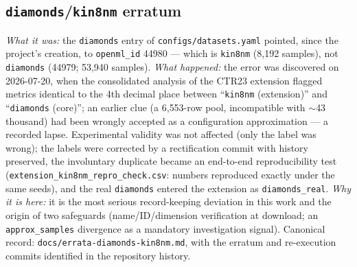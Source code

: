 \subsection{\texttt{diamonds}/\texttt{kin8nm} erratum}
\emph{What it was:} the \texttt{diamonds} entry of
\texttt{configs/\allowbreak datasets.\allowbreak yaml} pointed, since
the project's creation, to \texttt{openml\_id} 44980 --- which is
\texttt{kin8nm} (8{,}192 samples), not \texttt{diamonds} (44979;
53{,}940 samples). \emph{What happened:} the error was discovered on
2026-07-20, when the consolidated analysis of the CTR23 extension
flagged metrics identical to the 4th decimal place between
``\texttt{kin8nm} (extension)'' and ``\texttt{diamonds} (core)''; an
earlier clue (a 6{,}553-row pool, incompatible with $\sim$43
thousand) had been wrongly accepted as a configuration approximation
--- a recorded lapse. Experimental validity was not affected (only
the label was wrong); the labels were corrected by a rectification
commit with history preserved, the involuntary duplicate became an
end-to-end reproducibility test
(\texttt{extension\_\allowbreak kin8nm\_\allowbreak repro\_\allowbreak check.\allowbreak csv}:
numbers reproduced exactly under the same seeds), and the real
\texttt{diamonds} entered the extension as \texttt{diamonds\_real}.
\emph{Why it is here:} it is the most serious record-keeping
deviation in this work and the origin of two safeguards (name/ID/dimension
verification at download; an \texttt{approx\_\allowbreak samples}
divergence as a mandatory investigation signal). Canonical record:
\texttt{docs/\allowbreak errata-\allowbreak diamonds-\allowbreak kin8nm.\allowbreak md},
with the erratum and re-execution commits identified in the
repository history.

